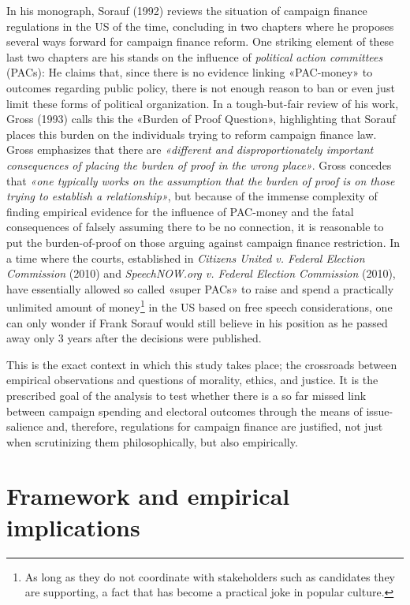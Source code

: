 \documentclass[11pt,a4paper]{article}
\begin{document}
In his monograph, Sorauf (1992) reviews the situation of campaign finance regulations in the US of the time, concluding in two chapters where he proposes several ways forward for campaign finance reform. One striking element of these last two chapters are his stands on the influence of \textit{political action committees} (PACs): He claims that, since there is no evidence linking «PAC-money» to outcomes regarding public policy, there is not enough reason to ban or even just limit these forms of political organization. In a tough-but-fair review of his work, Gross (1993) calls this the «Burden of Proof Question», highlighting that Sorauf places this burden on the individuals trying to reform campaign finance law. Gross emphasizes that there are \textit{«different and disproportionately important consequences of placing the burden of proof in the wrong place»}. Gross concedes that \textit{«one typically works on the assumption that the burden of proof is on those trying to establish a relationship»}, but because of the immense complexity of finding empirical evidence for the influence of PAC-money and the fatal consequences of falsely assuming there to be no connection, it is reasonable to put the burden-of-proof on those arguing against campaign finance restriction. In a time where the courts, established in \textit{Citizens United v. Federal Election Commission} (2010) and \textit{SpeechNOW.org v. Federal Election Commission} (2010), have essentially allowed so called «super PACs» to raise and spend a practically unlimited amount of money\footnote{ As long as they do not coordinate with stakeholders such as candidates they are supporting, a fact that has become a practical joke in popular culture.} in the US based on free speech considerations, one can only wonder if Frank Sorauf would still believe in his position as he passed away only 3 years after the decisions were published.

This is the exact context in which this study takes place; the crossroads between empirical observations and questions of morality, ethics, and justice. It is the prescribed goal of the analysis to test whether there is a so far missed link between campaign spending and electoral outcomes through the means of issue-salience and, therefore, regulations for campaign finance are justified, not just when scrutinizing them philosophically, but also empirically.


\section{Framework and empirical implications}
\end{document}

